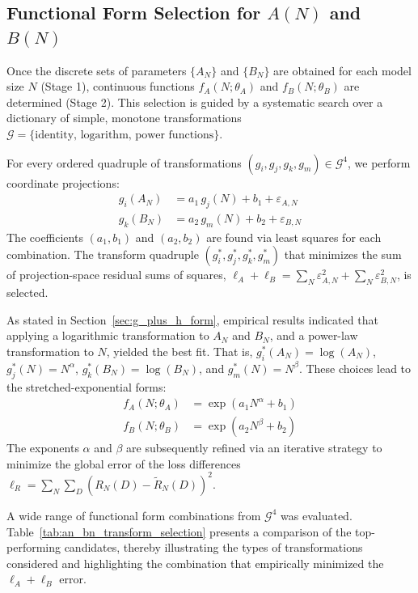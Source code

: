 \documentclass{article}
\begin{document}

\subsection{Functional Form Selection for $A(N)$ and $B(N)$}
\label{app:an_bn_form_selection}

Once the discrete sets of parameters $\{A_N\}$ and $\{B_N\}$ are obtained for each model size $N$ (Stage 1), continuous functions $f_A(N;\theta_A)$ and $f_B(N;\theta_B)$ are determined (Stage 2). This selection is guided by a systematic search over a dictionary of simple, monotone transformations $\mathcal{G} = \{\text{identity, logarithm, power functions}\}$.

For every ordered quadruple of transformations $(g_i, g_j, g_k, g_m) \in \mathcal{G}^4$, we perform coordinate projections:
\begin{align}
  g_i(A_N) &= a_1\,g_j(N) + b_1 + \varepsilon_{A,N} \\
  g_k(B_N) &= a_2\,g_m(N) + b_2 + \varepsilon_{B,N}
\end{align}
The coefficients $(a_1, b_1)$ and $(a_2, b_2)$ are found via least squares for each combination. The transform quadruple $(g_i^*, g_j^*, g_k^*, g_m^*)$ that minimizes the sum of projection-space residual sums of squares, $\ell_A + \ell_B = \sum_N \varepsilon_{A,N}^2 + \sum_N \varepsilon_{B,N}^2$, is selected.

As stated in Section~\ref{sec:g_plus_h_form}, empirical results indicated that applying a logarithmic transformation to $A_N$ and $B_N$, and a power-law transformation to $N$, yielded the best fit. That is, $g_i^*(A_N) = \log(A_N)$, $g_j^*(N) = N^{\alpha}$, $g_k^*(B_N) = \log(B_N)$, and $g_m^*(N) = N^{\beta}$. These choices lead to the stretched-exponential forms:
\begin{align}
  f_A(N;\theta_A) &= \exp(a_1 N^{\alpha} + b_1) \\
  f_B(N;\theta_B) &= \exp(a_2 N^{\beta} + b_2)
\end{align}
The exponents $\alpha$ and $\beta$ are subsequently refined via an iterative strategy to minimize the global error of the loss differences $\ell_R = \sum_N \sum_D (R_N(D) - \tilde{R}_N(D))^2$.

A wide range of functional form combinations from $\mathcal{G}^4$ was evaluated. Table~\ref{tab:an_bn_transform_selection} presents a comparison of the top-performing candidates, thereby illustrating the types of transformations considered and highlighting the combination that empirically minimized the $\ell_A+\ell_B$ error.
\end{document}
